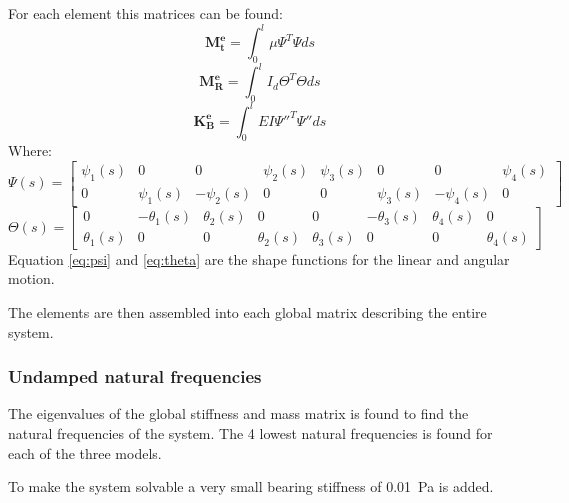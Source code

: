 For each element this matrices can be found:
\begin{equation}
    \mathbf{M_t^e} = \int_{0}^{l} \mu \Psi^T \Psi ds
    \label{eq:mass_matrix_linear}
\end{equation}
\begin{equation}
    \mathbf{M_R^e} = \int_{0}^{l} I_d \Theta^T \Theta ds
    \label{eq:mass_matrix_angular}
\end{equation}
\begin{equation}
    \mathbf{K_B^e} = \int_{0}^{l} E I \Psi''^T \Psi'' ds
\end{equation}
Where:
\begin{equation}
    \Psi(s) =
    \begin{bmatrix}
        \psi_1(s) & 0 & 0 & \psi_2(s) & \psi_3(s) & 0 & 0 & \psi_4(s) \\
        0 & \psi_1(s) & -\psi_2(s) & 0 & 0 & \psi_3(s) & -\psi_4(s) & 0
    \end{bmatrix}
    \label{eq:psi}
\end{equation}
\begin{equation}
    \Theta(s) = 
    \begin{bmatrix}
        0 & -\theta_1(s) & \theta_2(s) & 0 & 0 & -\theta_3(s) & \theta_4(s) & 0 \\
        \theta_1(s) & 0 & 0 & \theta_2(s) & \theta_3(s) & 0 & 0 & \theta_4(s)
    \end{bmatrix}
    \label{eq:theta}
\end{equation}
Equation \ref{eq:psi} and \ref{eq:theta} are the shape functions for the linear and angular motion.

The elements are then assembled into each global matrix describing the entire system.

\subsubsection{Undamped natural frequencies}
The eigenvalues of the global stiffness and mass matrix is found to find the natural frequencies of the system. The 4 lowest natural frequencies is found for each of the three models.

To make the system solvable a very small bearing stiffness of \SI{0.01}{\pascal} is added.

